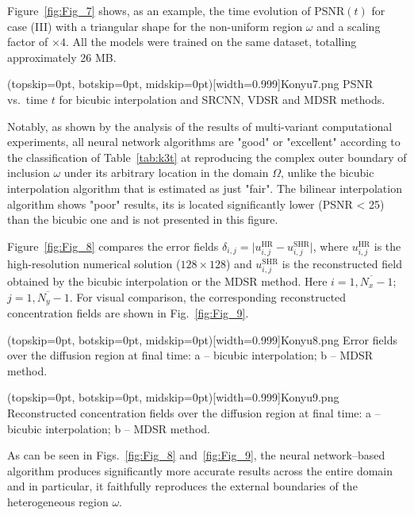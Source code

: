 \documentclass{ieeeaccess}
\begin{document}
Figure~\ref{fig:Fig_7} shows, as an example, the time evolution of PSNR$(t)$ for case (III) with a triangular shape for the non-uniform region $\omega$ and a scaling factor of $\times4$. All the models were trained on the same dataset, totalling approximately 26 MB.

\Figure[ht!](topskip=0pt, botskip=0pt, midskip=0pt)[width=0.999\linewidth]{Konyu7.png}
{PSNR vs.\ time $t$ for bicubic interpolation and SRCNN, VDSR and MDSR methods.
\label{fig:Fig_7}}

Notably, as shown by the analysis of the results of multi-variant computational experiments, all neural network algorithms are "good" or "excellent" according to the classification of Table~\ref{tab:k3t} at reproducing the complex outer boundary of inclusion $\omega$ under its arbitrary location in the domain $\Omega$, unlike the bicubic interpolation algorithm that is estimated as just "fair". The bilinear interpolation algorithm shows "poor" results, its
is located significantly lower (PSNR < 25) than the bicubic one and is not presented in this figure.

Figure~\ref{fig:Fig_8} compares the error fields ${\delta _{i,j}} = \big| u_{i,j}^{\mathrm{HR}} - u_{i,j}^{\mathrm{SHR}} \big|$, where $u_{i,j}^{\mathrm{HR}}$ is the high-resolution numerical solution ($128 \times 128$) and $u_{i,j}^{\mathrm{SHR}}$ is the reconstructed field obtained by the bicubic interpolation or the MDSR method. Here $i = \overline {1,{N_x} - 1} $; $j = \overline {1,{N_y} - 1} $. For visual  comparison, the corresponding reconstructed concentration fields are shown in Fig.~\ref{fig:Fig_9}.

\Figure[ht!](topskip=0pt, botskip=0pt, midskip=0pt)[width=0.999\linewidth]{Konyu8.png}
{Error fields over the diffusion region at final time: a -- bicubic interpolation; b -- MDSR method.
\label{fig:Fig_8}}

\Figure[ht!](topskip=0pt, botskip=0pt, midskip=0pt)[width=0.999\linewidth]{Konyu9.png}
{Reconstructed concentration fields over the diffusion region at final time: a -- bicubic interpolation; b -- MDSR method.}
\label{fig:Fig_9}

As can be seen in  Figs.~\ref{fig:Fig_8} and~\ref{fig:Fig_9}, the neural network–based algorithm produces significantly more accurate results across the entire domain and in particular, it faithfully reproduces the external boundaries of the heterogeneous region $\omega$.
\end{document}
